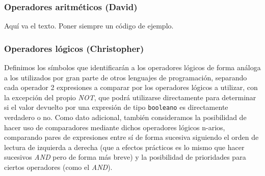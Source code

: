 \documentclass[11pt, english]{article}
\begin{document}
\subsubsection{Operadores aritméticos (David)}
Aquí va el texto. Poner siempre un código de ejemplo.
\newpage

\subsubsection{Operadores lógicos (Christopher)}
Definimos los símbolos que identificarán a los operadores lógicos de forma análoga a los utilizados por gran parte de otros lenguajes de programación, separando cada operador 2 expresiones a comparar por los operadores lógicos a utilizar, con la excepción del propio \emph{NOT}, que podrá utilizarse directamente para determinar si el valor devuelto por una expresión de tipo \texttt{booleano} es directamente verdadero o no. Como dato adicional, también consideramos la posibilidad de hacer uso de comparadores mediante dichos operadores lógicos n-arios, comparando pares de expresiones entre sí de forma sucesiva siguiendo el orden de lectura de izquierda a derecha (que a efectos prácticos es lo mismo que hacer sucesivos \emph{AND} pero de forma más breve) y la posibilidad de prioridades para ciertos operadores (como el \emph{AND}). \vspace{0px}
\end{document}
